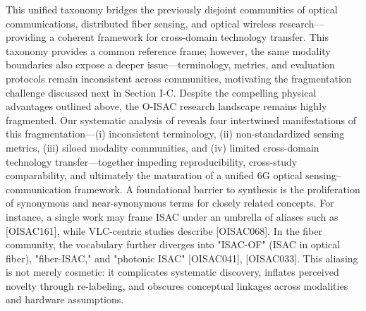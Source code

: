\markdownRendererOlEnd \markdownRendererInterblockSeparator
{}This unified taxonomy bridges the previously disjoint communities of optical communications, distributed fiber sensing, and optical wireless research—providing a coherent framework for cross-domain technology transfer. This taxonomy provides a common reference frame; however, the same modality boundaries also expose a deeper issue—terminology, metrics, and evaluation protocols remain inconsistent across communities, motivating the fragmentation challenge discussed next in Section I-C.\markdownRendererInterblockSeparator
{}
\markdownRendererSectionEnd 
\markdownRendererSectionEnd \markdownRendererSectionBegin
{}\markdownRendererInterblockSeparator
{}Despite the compelling physical advantages outlined above, the O-ISAC research landscape remains highly fragmented. Our systematic analysis of  reveals four intertwined manifestations of this fragmentation—(i) inconsistent terminology, (ii) non-standardized sensing metrics, (iii) siloed modality communities, and (iv) limited cross-domain technology transfer—together impeding reproducibility, cross-study comparability, and ultimately the maturation of a unified 6G optical sensing–communication framework.\markdownRendererParagraphSeparator
{} A foundational barrier to synthesis is the proliferation of synonymous and near-synonymous terms for closely related concepts. For instance, a single work may frame ISAC under an umbrella of aliases such as  [O\markdownRendererUnderscore{}ISAC\markdownRendererUnderscore{}161], while VLC-centric studies describe  [O\markdownRendererUnderscore{}ISAC\markdownRendererUnderscore{}068]. In the fiber community, the vocabulary further diverges into "ISAC-OF" (ISAC in optical fiber), "fiber-ISAC," and "photonic ISAC" [O\markdownRendererUnderscore{}ISAC\markdownRendererUnderscore{}041], [O\markdownRendererUnderscore{}ISAC\markdownRendererUnderscore{}033]. This aliasing is not merely cosmetic: it complicates systematic discovery, inflates perceived novelty through re-labeling, and obscures conceptual linkages across modalities and hardware assumptions.\markdownRendererParagraphSeparator
